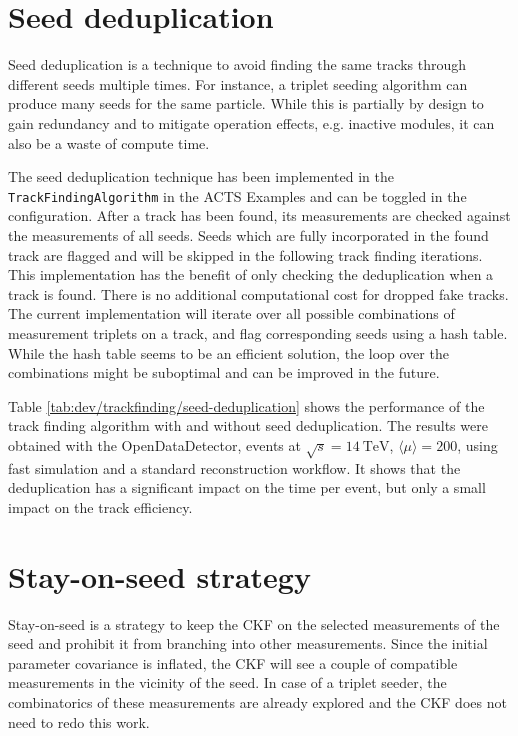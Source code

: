 \section{Seed deduplication}
\label{sec:dev/trackfinding/seed-deduplication}

Seed deduplication is a technique to avoid finding the same tracks through different seeds multiple times. For instance, a triplet seeding algorithm can produce many seeds for the same particle. While this is partially by design to gain redundancy and to mitigate operation effects, e.g. inactive modules, it can also be a waste of compute time.

The seed deduplication technique has been implemented in the \texttt{TrackFindingAlgorithm} in the ACTS Examples and can be toggled in the configuration. After a track has been found, its measurements are checked against the measurements of all seeds. Seeds which are fully incorporated in the found track are flagged and will be skipped in the following track finding iterations. This implementation has the benefit of only checking the deduplication when a track is found. There is no additional computational cost for dropped fake tracks. The current implementation will iterate over all possible combinations of measurement triplets on a track, and flag corresponding seeds using a hash table. While the hash table seems to be an efficient solution, the loop over the combinations might be suboptimal and can be improved in the future.



Table \ref{tab:dev/trackfinding/seed-deduplication} shows the performance of the track finding algorithm with and without seed deduplication. The results were obtained with the OpenDataDetector, \ttbar events at $\sqrt{s} = 14 \ \text{TeV}$, $\langle \mu \rangle = 200$, using fast simulation and a standard reconstruction workflow. It shows that the deduplication has a significant impact on the time per event, but only a small impact on the track efficiency.

\section{Stay-on-seed strategy}
\label{sec:dev/trackfinding/stay-on-seed}

Stay-on-seed is a strategy to keep the CKF on the selected measurements of the seed and prohibit it from branching into other measurements. Since the initial parameter covariance is inflated, the CKF will see a couple of compatible measurements in the vicinity of the seed. In case of a triplet seeder, the combinatorics of these measurements are already explored and the CKF does not need to redo this work.

